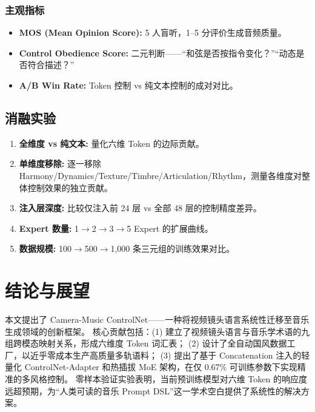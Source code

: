 \documentclass[12pt,a4paper]{article}
\begin{document}
\subsubsection{主观指标}

\begin{itemize}
\item \textbf{MOS (Mean Opinion Score):} 5 人盲听，1--5 分评价生成音频质量。
\item \textbf{Control Obedience Score:} 二元判断——“和弦是否按指令变化？”“动态是否符合描述？”
\item \textbf{A/B Win Rate:} Token 控制 vs 纯文本控制的成对对比。
\end{itemize}

\subsection{消融实验}

\begin{enumerate}
\item \textbf{全维度 vs 纯文本:} 量化六维 Token 的边际贡献。
\item \textbf{单维度移除:} 逐一移除 Harmony/Dynamics/Texture/Timbre/Articulation/Rhythm，测量各维度对整体控制效果的独立贡献。
\item \textbf{注入层深度:} 比较仅注入前 24 层 vs 全部 48 层的控制精度差异。
\item \textbf{Expert 数量:} 1$\rightarrow$2$\rightarrow$3$\rightarrow$5 Expert 的扩展曲线。
\item \textbf{数据规模:} 100$\rightarrow$500$\rightarrow$1,000 条三元组的训练效果对比。
\end{enumerate}

\section{结论与展望}

本文提出了 Camera-Music ControlNet——一种将视频镜头语言系统性迁移至音乐生成领域的创新框架。
核心贡献包括：(1) 建立了视频镜头语言与音乐学术语的九组跨模态映射关系，形成六维度 Token 词汇表；
(2) 设计了全自动国风数据工厂，以近乎零成本生产高质量多轨语料；
(3) 提出了基于 Concatenation 注入的轻量化 ControlNet-Adapter 和热插拔 MoE 架构，在仅 0.67\% 可训练参数下实现精准的多风格控制。
零样本验证实验表明，当前预训练模型对六维 Token 的响应度远超预期，为“人类可读的音乐 Prompt DSL”这一学术空白提供了系统性的解决方案。
\end{document}
